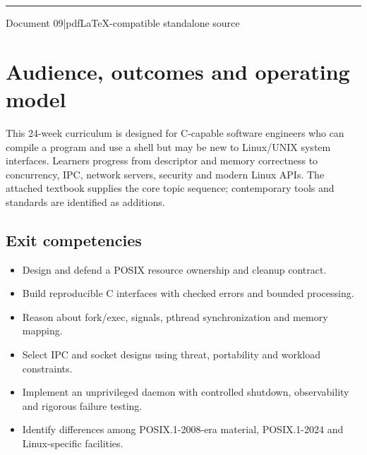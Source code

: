 \documentclass[11pt,letterpaper,oneside]{report}
\begin{document}
\hypersetup{pageanchor=false}%
\begin{titlepage}\centering{}\vspace{0.6cm}{\Large 24-week engineer training path, milestones and evaluations\par}\vspace{2cm}\rule{0.75\textwidth}{1.2pt}\par\vspace{0.55cm}{\large An original companion to Michael Kerrisk\textquotesingle s 2010 text}\par\vspace{0.3cm}{\large Edition 1.0\quad |\quad October 2026}\par\vfill{\small Document 09\quad |\quad pdfLaTeX-compatible standalone source}\par\end{titlepage}\hypersetup{pageanchor=true}
\tableofcontents\clearpage
\chapter{Audience, outcomes and operating model}
This 24-week curriculum is designed for C-capable software engineers who can compile a program and use a shell but may be new to Linux/UNIX system interfaces. Learners progress from descriptor and memory correctness to concurrency, IPC, network servers, security and modern Linux APIs. The attached textbook supplies the core topic sequence; contemporary tools and standards are identified as additions.

\section{Exit competencies}
\begin{itemize}
\item Design and defend a POSIX resource ownership and cleanup contract.
\item Build reproducible C interfaces with checked errors and bounded processing.
\item Reason about fork/exec, signals, pthread synchronization and memory mapping.
\item Select IPC and socket designs using threat, portability and workload constraints.
\item Implement an unprivileged daemon with controlled shutdown, observability and rigorous failure testing.
\item Identify differences among POSIX.1-2008-era material, POSIX.1-2024 and Linux-specific facilities.
\end{itemize}
\end{document}
